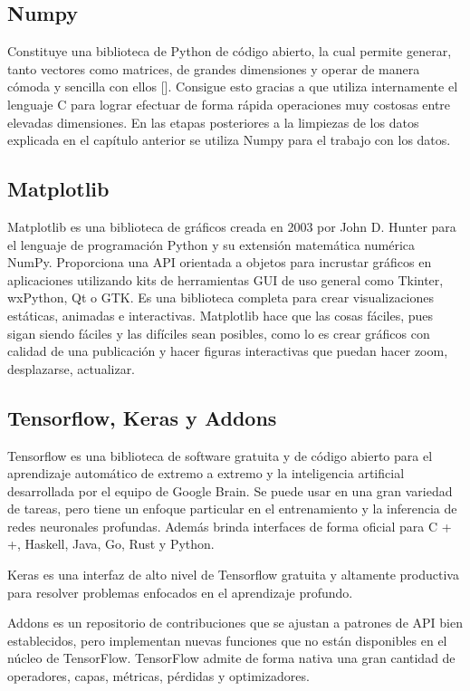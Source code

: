 \subsection{Numpy}
Constituye una biblioteca de Python de código abierto, la cual permite generar, tanto vectores como matrices, de grandes dimensiones y operar de manera cómoda y sencilla con ellos [\cite{numpy_2012}].
Consigue esto gracias a que utiliza internamente el lenguaje C para lograr efectuar de forma rápida operaciones muy costosas entre elevadas dimensiones.
En las etapas posteriores a la limpiezas de los datos explicada en el capítulo anterior se utiliza Numpy para el trabajo con los datos.

\subsection{Matplotlib}
Matplotlib es una biblioteca de gráficos creada en 2003 por John D. Hunter para el lenguaje de programación Python y su extensión matemática numérica NumPy. Proporciona una API orientada a objetos para incrustar gráficos en aplicaciones utilizando kits de herramientas GUI de uso general como Tkinter, wxPython, Qt o GTK.
Es una biblioteca completa para crear visualizaciones estáticas, animadas e interactivas. Matplotlib hace que las cosas fáciles, pues sigan siendo fáciles y las difíciles sean posibles, como lo es crear gráficos con calidad de una publicación y hacer figuras interactivas que puedan hacer zoom, desplazarse, actualizar.

\subsection{Tensorflow, Keras y Addons}
Tensorflow es una biblioteca de software gratuita y de código abierto para el aprendizaje automático de extremo a extremo y la inteligencia artificial desarrollada por el equipo de Google Brain. Se puede usar en una gran variedad de tareas, pero tiene un enfoque particular en el entrenamiento y la inferencia de redes neuronales profundas. Además brinda interfaces de forma oficial para
C + +, Haskell, Java, Go, Rust y Python.

Keras es una interfaz de alto nivel de Tensorflow gratuita y altamente productiva para resolver problemas enfocados en el aprendizaje profundo.

Addons es un repositorio de contribuciones que se ajustan a patrones de API bien establecidos, pero implementan nuevas funciones que no están disponibles en el núcleo de TensorFlow. TensorFlow admite de forma nativa una gran cantidad de operadores, capas, métricas, pérdidas y optimizadores.

